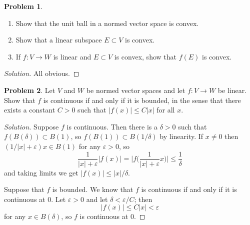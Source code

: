 \documentclass[11pt]{article}
\theoremstyle{definition}
\newtheorem{prob}{Problem}
\begin{document}
\begin{prob}
\begin{enumerate}
\item
Show that the unit ball in a normed vector space is convex.

\item
Show that a linear subspace $E \subset V$ is convex.

\item
If $f : V \to W$ is linear and $E \subset V$ is convex, show that $f(E)$ is convex.
\end{enumerate}
\end{prob}

\begin{proof}[Solution]
All obvious.
\end{proof}

\begin{prob}
Let $V$ and $W$ be normed vector spaces and let $f : V \to W$ be linear.
Show that $f$ is continuous if and only if it is bounded, in the sense
that there exists a constant $C > 0$ such that $|f(x)| \leq C |x|$ for all $x$.
\end{prob}

\begin{proof}[Solution]
Suppose $f$ is continuous.
Then there is a $\delta > 0$ such that $f(B(\delta)) \subset B(1)$, so
$f(B(1)) \subset B(1/\delta)$ by linearity.
If $x \not= 0$ then $(1 / |x| + \varepsilon) x \in B(1)$ for any $\varepsilon > 0$,
so
\[
\frac{1}{|x| + \varepsilon} | f( x ) |
= \biggl| f\biggl( \frac{1}{|x| + \varepsilon} x \biggr) \biggr|
\leq \frac{1}{\delta}
\]
and taking limits we get $|f(x)| \leq |x| / \delta$.

Suppose that $f$ is bounded.
We know that $f$ is continuous if and only if it is continuous at $0$.
Let $\varepsilon > 0$ and let $\delta < \varepsilon/C$; then
\[
|f(x)| \leq C |x| < \varepsilon
\]
for any $x \in B(\delta)$, so $f$ is continuous at $0$.
\end{proof}
\end{document}

